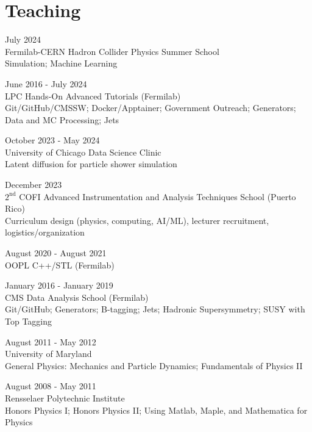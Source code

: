\section{Teaching}
\begin{description}[leftmargin=12pt,font=\normalfont\textit]
\item[Lecturer] \hfill July 2024\\
Fermilab-CERN Hadron Collider Physics Summer School\\
Simulation; Machine Learning
\item[Facilitator] \hfill June 2016 - July 2024\\
LPC Hands-On Advanced Tutorials (Fermilab)\\
Git/GitHub/CMSSW; Docker/Apptainer; Government Outreach; Generators; Data and MC Processing; Jets
\item[Project Advisor] \hfill October 2023 - May 2024\\
University of Chicago Data Science Clinic\\
Latent diffusion for particle shower simulation
\item[Co-director] \hfill December 2023\\
$2^{\text{nd}}$ COFI Advanced Instrumentation and Analysis Techniques School (Puerto Rico)\\
Curriculum design (physics, computing, AI/ML), lecturer recruitment, logistics/organization
\item[Teaching Assistant] \hfill August 2020 - August 2021\\
OOPL C++/STL (Fermilab)
\item[Facilitator] \hfill January 2016 - January 2019\\
CMS Data Analysis School (Fermilab)\\
Git/GitHub; Generators; B-tagging; Jets; Hadronic Supersymmetry; SUSY with Top Tagging
\item[Graduate Teaching Assistant] \hfill August 2011 - May 2012\\
University of Maryland\\
General Physics: Mechanics and Particle Dynamics; Fundamentals of Physics II
\item[Undergraduate Teaching Assistant] \hfill August 2008 - May 2011\\
Rensselaer Polytechnic Institute\\
Honors Physics I; Honors Physics II; Using Matlab, Maple, and Mathematica for Physics
\end{description}